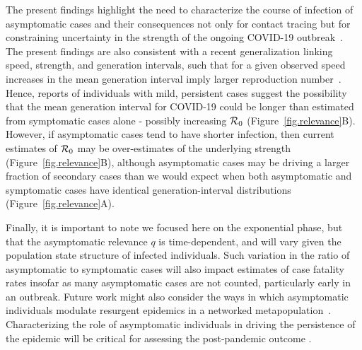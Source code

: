 The present findings highlight the need to characterize the course of infection of asymptomatic cases and their consequences not only for contact tracing but for constraining uncertainty in the strength of the ongoing COVID-19 outbreak~\citep{park_preprint}.
The present findings are also consistent with a recent generalization linking speed, strength, and generation intervals, such that for a given observed speed increases in the mean generation interval imply larger reproduction number~\citep{park_2019practical}. 
Hence, reports of individuals with mild, persistent cases suggest the possibility that the mean generation interval for COVID-19 could be longer than estimated from symptomatic cases alone - possibly increasing ${\cal{R}}_0$ (Figure~\ref{fig.relevance}B).
However, if asymptomatic cases tend to have shorter infection, then current estimates of ${\cal{R}}_0$ may be over-estimates of the underlying strength (Figure~\ref{fig.relevance}B), although asymptomatic cases may be driving a larger fraction of secondary cases than we would expect when both asymptomatic and symptomatic cases have identical generation-interval distributions (Figure~\ref{fig.relevance}A).

Finally, it is important to note we focused here on the exponential phase, but that the asymptomatic relevance $q$ is time-dependent, and will vary given the population state structure of infected individuals. Such variation in the ratio of asymptomatic to symptomatic cases will also impact estimates of case fatality rates insofar as many asymptomatic cases are not counted, particularly early in an outbreak.
Future work might also consider the ways in which asymptomatic individuals modulate resurgent epidemics in a networked metapopulation~\citep{watts_pnas2005}.
Characterizing the role of asymptomatic individuals in driving the persistence of the epidemic will be critical for assessing the post-pandemic outcome \citep{lipsitch_preprint}.

